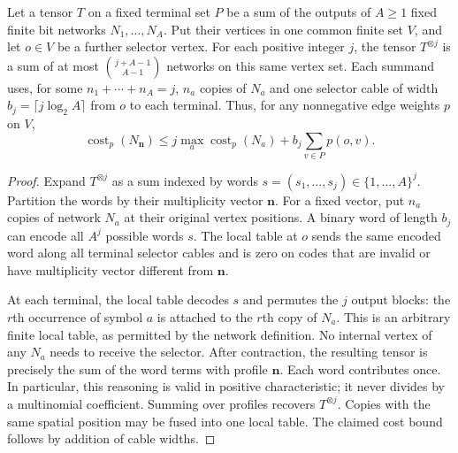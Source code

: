 \begin{lemma}
\label{lem:profiles}
Let a tensor $T$ on a fixed terminal set $P$ be a sum of the outputs of
$A\ge1$ fixed finite bit networks $N_1,\ldots,N_A$.  Put their vertices in
one common finite set $V$, and let $o\in V$ be a further selector vertex.
For each positive integer $j$, the tensor $T^{\otimes j}$ is a sum of at
most $\binom{j+A-1}{A-1}$ networks on this same vertex set.  Each summand
uses, for some $n_1+\cdots+n_A=j$, $n_a$ copies of $N_a$ and one selector
cable of width $b_j=\lceil j\log_2 A\rceil$ from $o$ to each terminal.
Thus, for any nonnegative edge weights $p$ on $V$,
\[
 \operatorname{cost}_p(N_{\boldsymbol n})
 \le j\max_a\operatorname{cost}_p(N_a)
       +b_j\sum_{v\in P}p(o,v).
\]
\end{lemma}
\begin{proof}
Expand $T^{\otimes j}$ as a sum indexed by words
$s=(s_1,\ldots,s_j)\in\{1,\ldots,A\}^j$.  Partition the words by their
multiplicity vector $\boldsymbol n$.  For a fixed vector, put $n_a$ copies
of network $N_a$ at their original vertex positions.  A binary word of
length $b_j$ can encode all $A^j$ possible words $s$.  The local table at
$o$ sends the same encoded word along all terminal selector cables and
is zero on codes that are invalid or have multiplicity vector different
from $\boldsymbol n$.

At each terminal, the local table decodes $s$ and permutes the $j$ output
blocks: the $r$th occurrence of symbol $a$ is attached to the $r$th copy of
$N_a$.  This is an arbitrary finite local table, as permitted by the
network definition.  No internal vertex of any $N_a$ needs to receive the
selector.  After contraction, the resulting tensor is precisely the sum
of the word terms with profile $\boldsymbol n$.  Each word contributes
once.  In particular, this reasoning is valid in positive characteristic;
it never divides by a multinomial coefficient.  Summing over profiles
recovers $T^{\otimes j}$.  Copies with the same spatial position may be
fused into one local table.  The claimed cost bound follows by addition
of cable widths.
\end{proof}


